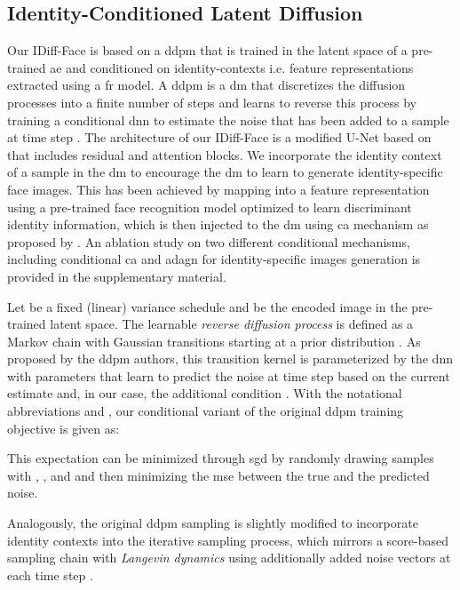 \documentclass[10pt,twocolumn,letterpaper]{article}
\newcommand{\approachname}{IDiff-Face }
\begin{document}
\subsection{Identity-Conditioned Latent Diffusion}
\vspace{-1mm}
Our \approachname is based on a \acrshort{ddpm} that is trained in the latent space of a pre-trained \acrshort{ae} \cite{Rombach2021} and conditioned on identity-contexts i.e. feature representations extracted using a \acrshort{fr} model.
A \acrshort{ddpm} \cite{Ho2020} is a \acrshort{dm} that discretizes the diffusion processes into a finite number  of steps and learns to reverse this process by training a conditional \acrshort{dnn} to estimate the noise that has been added to a sample  at time step . The architecture of our \approachname is a modified U-Net \cite{Ronneberger2015} based on \cite{Ho2020} that includes residual and attention blocks.
We incorporate the identity context of a sample  in the \acrshort{dm} to encourage the \acrshort{dm} to learn to generate identity-specific face images. 
This has been achieved by mapping  into a feature representation  using a pre-trained face recognition model  optimized to learn discriminant identity information, which is then injected to the \acrshort{dm} using \acrshort{ca} mechanism as proposed by \cite{Rombach2021}. An ablation study on two different conditional mechanisms, including conditional \acrshort{ca} \cite{Rombach2021} and \acrfull{adagn} \cite{Dhariwal2021} for identity-specific images generation is provided in the supplementary material.

Let  be a fixed (linear) variance schedule and  be the encoded image  in the pre-trained latent space. The learnable \textit{reverse diffusion process} is defined as a Markov chain with Gaussian transitions  starting at a prior distribution . As proposed by the \acrshort{ddpm} authors, this transition kernel is parameterized by the \acrshort{dnn} with parameters  that learn to predict the noise at time step  based on the current estimate  and, in our case, the additional condition . With the notational abbreviations  and  \cite{Ho2020}, our conditional variant of the original \acrshort{ddpm} training objective is given as:
\vspace{-1mm}


This expectation can be minimized through \acrshort{sgd} by randomly drawing samples  with
, , and   and then minimizing the \acrshort{mse} between the true and the predicted noise.

Analogously, the original \acrshort{ddpm} \cite{Ho2020} sampling is slightly modified to incorporate identity contexts  into the iterative sampling process, which mirrors a score-based sampling chain with \textit{Langevin dynamics} using additionally added noise vectors  at each time step .
\vspace{-1mm}
\end{document}
